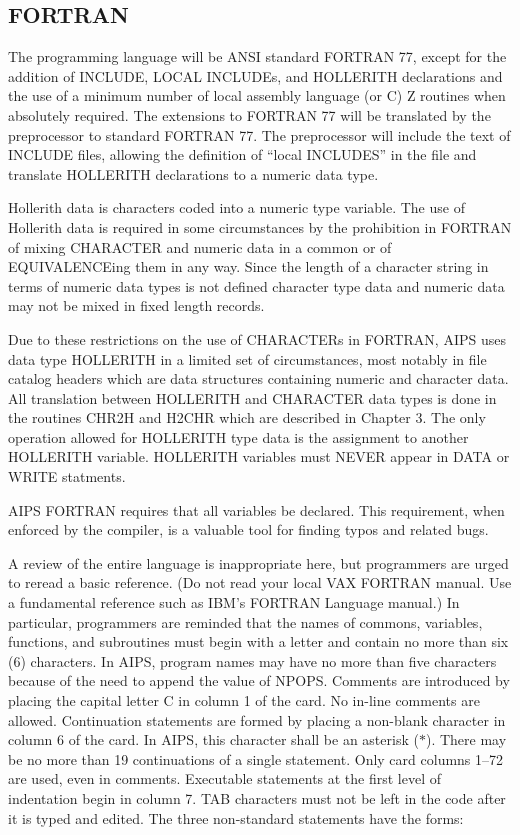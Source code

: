 \subsection{FORTRAN}
The programming language will be ANSI standard FORTRAN 77, except for
the addition of INCLUDE, LOCAL INCLUDEs, and HOLLERITH declarations and
the use of a minimum number of local assembly language (or C) Z
routines when absolutely required.  The extensions to FORTRAN 77 will
be translated by the preprocessor to standard FORTRAN 77.  The
preprocessor will include the text of INCLUDE files, allowing the
definition of ``local INCLUDES'' in the file and translate HOLLERITH
declarations to a numeric data type.

Hollerith data is characters coded into a numeric type variable.  The
use of Hollerith data is required in some circumstances by the
prohibition in FORTRAN of mixing CHARACTER and numeric data in a
common or of EQUIVALENCEing them in any way.  Since the length of a
character string in terms of numeric data types is not defined
character type data and numeric data may not be mixed in fixed length
records.

Due to these restrictions on the use of CHARACTERs in FORTRAN, AIPS
uses data type HOLLERITH in a limited set of circumstances, most
notably in file catalog headers which are data structures containing
numeric and character data.  All translation between HOLLERITH and
CHARACTER data types is done in the routines CHR2H and H2CHR which are
described in Chapter 3.  The only operation allowed for HOLLERITH type
data is the assignment to another HOLLERITH variable.  HOLLERITH
variables must NEVER appear in DATA or WRITE statments.

AIPS FORTRAN requires that all variables be declared.  This
requirement, when enforced by the compiler, is a valuable tool for
finding typos and related bugs.

A review of the entire language is inappropriate here, but programmers
are urged to reread a basic reference.  (Do not read your local VAX
FORTRAN manual.  Use a fundamental reference such as IBM's FORTRAN
Language manual.)  In particular, programmers are reminded that the
names of commons, variables, functions, and subroutines must begin
with a letter and contain no more than six (6) characters.  In AIPS,
program names may have no more than five characters because of the
need to append the value of NPOPS. Comments are introduced by placing
the capital letter C in column 1 of the card.  No in-line comments are
allowed.  Continuation statements are formed by placing a non-blank
character in column 6 of the card.  In AIPS, this character shall be
an asterisk ($\ast$).  There may be no more than 19 continuations of a
single statement.  Only card columns 1--72 are used, even in comments.
Executable statements at the first level of indentation begin in
column 7.  TAB characters must not be left in the code after it is
typed and edited. The three non-standard statements have the forms:

